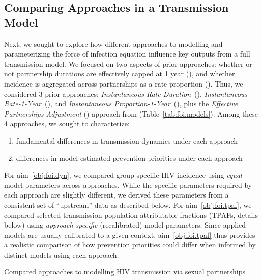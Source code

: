 \subsection{Comparing Approaches in a Transmission Model}\label{foi.exp.model}
Next, we sought to explore how different approaches to
modelling and parameterizing the force of infection equation
influence key outputs from a full transmission model.
We focused on two aspects of prior approaches:
whether or not partnership durations are effectively capped at 1 year (), and
whether incidence is aggregated across partnerships as a rate \vs proportion ().
Thus, we considered 3 prior approaches:
\emph{Instantaneous Rate-Duration}~(\ird),
\emph{Instantaneous Rate-1-Year}~(\iry), and
\emph{Instantaneous Proportion-1-Year}~(\ipy),
plus the \emph{Effective Partnerships Adjustment} (\epa) approach from 
(Table~\ref{tab:foi.models}).
Among these 4 approaches, we sought to characterize:
\begin{enumerate}
  \item \label{obj:foi.dyn}
  fundamental differences in transmission dynamics under each approach
  \item \label{obj:foi.tpaf}
  differences in model-estimated prevention priorities under each approach
  \end{enumerate}
For aim~\ref{obj:foi.dyn}, we compared group-specific HIV incidence
using \emph{equal} model parameters across approaches.
While the specific parameters required by each approach are slightly different,
we derived these parameters from a consistent set of ``upstream'' data as described below.
For aim~\ref{obj:foi.tpaf}, we compared selected
transmission population attributable fractions (TPAFs, details below)
using \emph{approach-specific} (\ie recalibrated) model parameters.
Since applied models are usually calibrated to a given context,
aim~\ref{obj:foi.tpaf} thus provides a realistic comparison of
how prevention priorities could differ when informed by distinct models using each approach.
\begin{table}
  \centering
  \caption{Compared approaches to modelling HIV transmission via sexual partnerships}
  \label{tab:foi.models}
  
\end{table}
